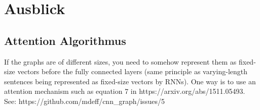 \chapter{Ausblick}

\section{Attention Algorithmus}

If the graphs are of different sizes, you need to somehow represent them as fixed-size vectors before the fully connected layers (same principle as varying-length sentences being represented as fixed-size vectors by RNNs).
One way is to use an attention mechanism such as equation 7 in https://arxiv.org/abs/1511.05493.
See: https://github.com/mdeff/cnn_graph/issues/5
